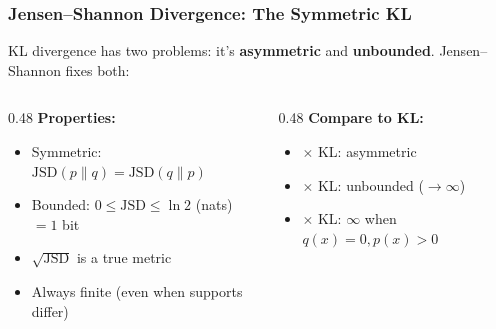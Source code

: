 \documentclass[aspectratio=169]{beamer}
\begin{document}
\begin{frame}
\frametitle{Jensen--Shannon Divergence: The Symmetric KL}

\small
KL divergence has two problems: it's \textbf{asymmetric} and \textbf{unbounded}.
Jensen--Shannon fixes both:

\vspace{0.1cm}
\begin{center}
\end{center}

\vspace{0.15cm}
\begin{columns}[T]
\begin{column}{0.48\textwidth}
\textbf{Properties:}
\begin{itemize}\setlength{\itemsep}{3pt}
  \item \textcolor{paramgreen}{\checkmark} Symmetric: $\text{JSD}(p\|q) = \text{JSD}(q\|p)$
  \item \textcolor{paramgreen}{\checkmark} Bounded: $0 \leq \text{JSD} \leq \ln 2$ (nats) $= 1$ bit
  \item \textcolor{paramgreen}{\checkmark} $\sqrt{\text{JSD}}$ is a true metric
  \item \textcolor{paramgreen}{\checkmark} Always finite (even when supports differ)
\end{itemize}
\end{column}
\begin{column}{0.48\textwidth}
\vspace{0.1cm}
\textbf{Compare to KL:}
\begin{itemize}\setlength{\itemsep}{3pt}
  \item \textcolor{sampred}{\textbf{$\times$}} KL: asymmetric
  \item \textcolor{sampred}{\textbf{$\times$}} KL: unbounded ($\to\infty$)
  \item \textcolor{sampred}{\textbf{$\times$}} KL: $\infty$ when $q(x)=0, p(x)>0$
\end{itemize}
\end{column}
\end{columns}

\vspace{0.05cm}
\begin{center}
\end{center}
\end{frame}
\end{document}
